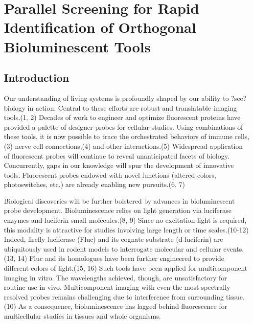 
\chapter{Parallel Screening for Rapid Identification of Orthogonal Bioluminescent Tools}
\section{Introduction}
Our understanding of living systems is profoundly shaped by our ability to ?see? biology in action. Central to these efforts are robust and translatable imaging tools.(1, 2) Decades of work to engineer and optimize fluorescent proteins have provided a palette of designer probes for cellular studies. Using combinations of these tools, it is now possible to trace the orchestrated behaviors of immune cells,(3) nerve cell connections,(4) and other interactions.(5) Widespread application of fluorescent probes will continue to reveal unanticipated facets of biology. Concurrently, gaps in our knowledge will spur the development of innovative tools. Fluorescent probes endowed with novel functions (altered colors, photoswitches, etc.) are already enabling new pursuits.(6, 7)
\par
Biological discoveries will be further bolstered by advances in bioluminescent probe development. Bioluminescence relies on light generation via luciferase enzymes and luciferin small molecules.(8, 9) Since no excitation light is required, this modality is attractive for studies involving large length or time scales.(10-12) Indeed, firefly luciferase (Fluc) and its cognate substrate (d-luciferin) are ubiquitously used in rodent models to interrogate molecular and cellular events.(13, 14) Fluc and its homologues have been further engineered to provide different colors of light.(15, 16) Such tools have been applied for multicomponent imaging in vitro. The wavelengths achieved, though, are unsatisfactory for routine use in vivo. Multicomponent imaging with even the most spectrally resolved probes remains challenging due to interference from surrounding tissue.(10) As a consequence, bioluminescence has lagged behind fluorescence for multicellular studies in tissues and whole organisms.
\par
